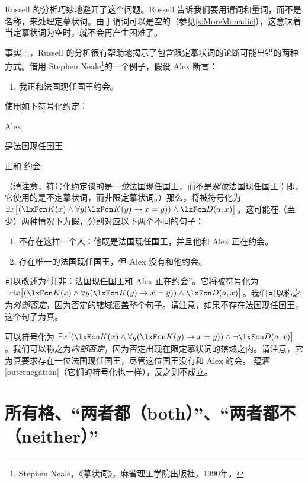 Russell 的分析巧妙地避开了这个问题。Russell 告诉我们要用谓词和量词，而不是名称，来处理定摹状词。由于谓词可以是空的（参见\cref{s:MoreMonadic}），这意味着当定摹状词为空时，就不会再产生困难了。

事实上，Russell 的分析很有帮助地揭示了包含限定摹状词的论断可能出错的两种方式。借用 Stephen Neale\footnote{Stephen Neale，《摹状词》，麻省理工学院出版社，1990年。}的一个例子，假设 Alex 断言：
	\begin{enumerate}
		\item\label{kingdate} 我正和法国现任国王约会。
	\end{enumerate}
使用如下符号化约定：
	\begin{ekey}
		\item[a] Alex
		\item[\atom{K}{x}]  是法国现任国王
		\item[\atom{D}{x,y}]  正和  约会
	\end{ekey}
	（请注意，符号化约定谈的是\emph{一位}法国现任国王，而不是\emph{那位}法国现任国王；即，它使用的是不定摹状词，而非限定摹状词。）那么，将被符号化为 $\exists x \bigl[(\atom{K}{x} \eand \forall y(\atom{K}{y} \eif  x = y)) \eand \atom{D}{a,x}\bigr]$。这可能在（至少）两种情况下为假，分别对应以下两个不同的句子：
	\begin{enumerate}
		\item\label{outernegation} 不存在这样一个人：他既是法国现任国王，并且他和 Alex 正在约会。
		\item\label{innernegation} 存在唯一的法国现任国王，但 Alex 没有和他约会。
	\end{enumerate}
可以改述为“并非：法国现任国王和 Alex 正在约会”。它将被符号化为 $\enot \exists x\bigl[(\atom{K}{x} \eand \forall y(\atom{K}{y} \eif  x = y)) \eand \atom{D}{a,x} \bigr]$。我们可以称之为\emph{外部否定}，因为否定的辖域涵盖整个句子。请注意，如果不存在法国现任国王，这个句子为真。

可以符号化为 $\exists x \bigl[(\atom{K}{x} \eand \forall y(\atom{K}{y} \eif x = y)) \eand \enot \atom{D}{a,x}\bigr]$。我们可以称之为\emph{内部否定}，因为否定出现在限定摹状词的辖域之内。请注意，它为真要求存在一位法国现任国王，尽管这位国王没有和 Alex 约会。
蕴涵\cref*{outernegation}（它们的符号化也一样），反之则不成立。

\section{所有格、“两者都（both）”、“两者都不（neither）”}

